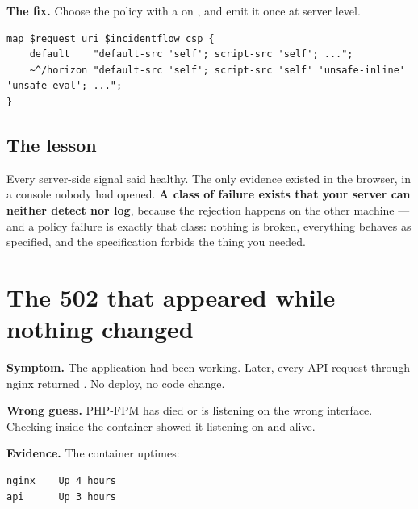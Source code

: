 \textbf{The fix.} Choose the policy with a  on ,
and emit it once at server level.

\begin{lstlisting}[language=nginxconf]
map $request_uri $incidentflow_csp {
    default    "default-src 'self'; script-src 'self'; ...";
    ~^/horizon "default-src 'self'; script-src 'self' 'unsafe-inline' 'unsafe-eval'; ...";
}
\end{lstlisting}



\subsection{The lesson}

Every server-side signal said healthy. The only evidence existed in the
browser, in a console nobody had opened. \textbf{A class of failure exists that
your server can neither detect nor log}, because the rejection happens on the
other machine --- and a policy failure is exactly that class: nothing is broken,
everything behaves as specified, and the specification forbids the thing you
needed.

\section{The 502 that appeared while nothing changed}

\textbf{Symptom.} The application had been working. Later, every API request
through nginx returned . No deploy, no code change.

\textbf{Wrong guess.} PHP-FPM has died or is listening on the wrong interface.
Checking inside the container showed it listening on  and alive.

\textbf{Evidence.} The container uptimes:

\begin{lstlisting}
nginx    Up 4 hours
api      Up 3 hours
\end{lstlisting}

